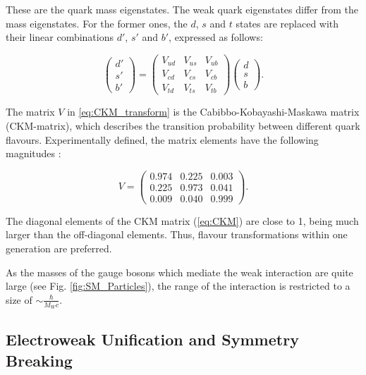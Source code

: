 These are the quark mass eigenstates. The weak quark eigenstates differ from the mass eigenstates. For the former ones, the $d$, $s$ and $t$ states are replaced with 
their linear combinations $d'$, $s'$ and $b'$, expressed as follows:

\begin{equation} \label{eq:CKM_transform}
\left( \begin{array}{c} d' \\ s' \\ b' \end{array} \right) = 
\left( \begin{array}{ccc} V_{ud} & V_{us} & V_{ub} \\ V_{cd} & V_{cs} & V_{cb} \\ V_{td} & V_{ts} & V_{tb} \end{array} \right)
\left( \begin{array}{c} d \\ s \\ b\end{array} \right).
\end{equation}

The matrix $V$ in \ref{eq:CKM_transform} is the Cabibbo-Kobayashi-Maskawa matrix \cite{Kobayashi:1973fv} (CKM-matrix), which describes the transition probability 
between different quark flavours. Experimentally defined, the matrix elements have the following magnitudes \cite{PDG-2012}:

\begin{equation} \label{eq:CKM}
 V = \left( \begin{array}{ccc} 0.974 & 0.225 & 0.003 \\ 0.225 & 0.973 & 0.041 \\ 0.009 & 0.040 & 0.999 \end{array} \right).
\end{equation}

The diagonal elements of the CKM matrix (\ref{eq:CKM}) are close to 1, being much larger than the off-diagonal elements. Thus, flavour transformations
within one generation are preferred.

As the masses of the gauge bosons which mediate the weak interaction are quite large (see Fig. \ref{fig:SM_Particles}), the range of the interaction is restricted
to a size of $\sim \frac{\hbar}{M_{W}c}$.

\subsection{Electroweak Unification and Symmetry Breaking}

